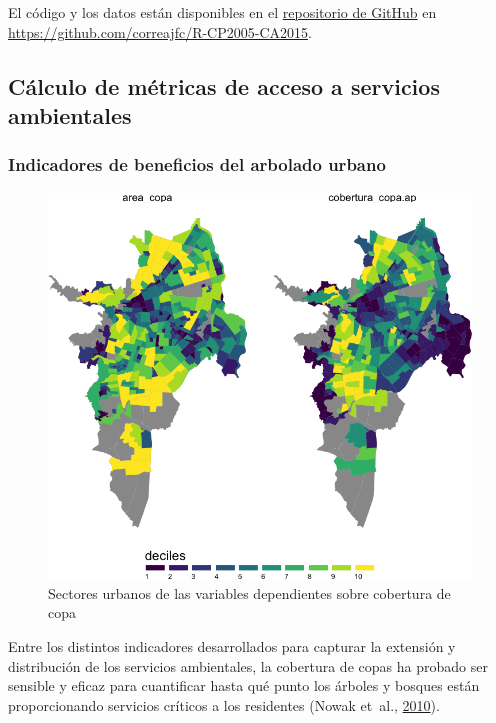 \documentclass[12pt,a4paper,oneside, openany]{book}
\theoremstyle{definition}
\theoremstyle{definition}
\theoremstyle{definition}
\theoremstyle{remark}
\begin{document}
El código y los datos están disponibles en el
\href{https://github.com/correajfc/R-CP2005-CA2015}{repositorio de
GitHub} en \url{https://github.com/correajfc/R-CP2005-CA2015}.

\subsection{Cálculo de métricas de acceso a servicios
ambientales}\label{cuxe1lculo-de-muxe9tricas-de-acceso-a-servicios-ambientales}

\subsubsection{Indicadores de beneficios del arbolado
urbano}\label{indicadores-de-beneficios-del-arbolado-urbano}

\begin{figure}[H]

{\centering \includegraphics[width=0.8\linewidth]{tesis-unigis_files/figure-latex/mapa-copa-dep-1} 

}

\caption{Sectores urbanos de las variables dependientes sobre cobertura de copa}\label{fig:mapa-copa-dep}
\end{figure}

Entre los distintos indicadores desarrollados para capturar la extensión
y distribución de los servicios ambientales, la cobertura de copas ha
probado ser sensible y eficaz para cuantificar hasta qué punto los
árboles y bosques están proporcionando servicios críticos a los
residentes (Nowak et~al.,
\protect\hyperlink{ref-nowak_sustaining_2010}{2010}).
\end{document}
